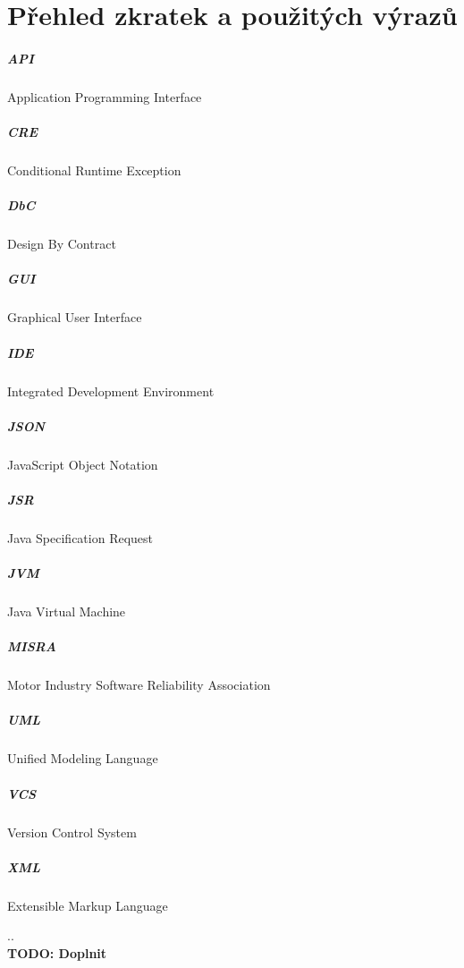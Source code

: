 \chapter*{Přehled zkratek a použitých výrazů}

\paragraph{API}
	Application Programming Interface
	
\paragraph{CRE}
	Conditional Runtime Exception

\paragraph{DbC}
	Design By Contract

\paragraph{GUI}	
	Graphical User Interface

\paragraph{IDE}
	Integrated Development Environment
		
\paragraph{JSON}
	JavaScript Object Notation

\paragraph{JSR}
	Java Specification Request
	
\paragraph{JVM}
	Java Virtual Machine
	
\paragraph{MISRA}
	Motor Industry Software Reliability Association
	
\paragraph{UML}
	Unified Modeling Language
	
\paragraph{VCS}
	Version Control System
		
\paragraph{XML}
	Extensible Markup Language
	
	
..\\
\textbf{\textcolor{pblue}{TODO: Doplnit}}\\
